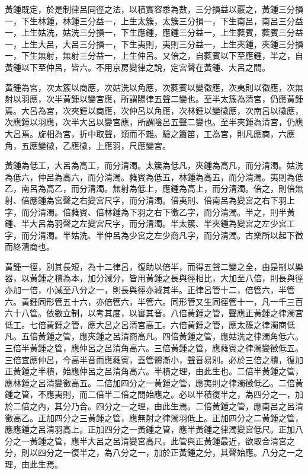 \begin{pinyinscope}
黃鍾既定，於是制律呂同徑之法，以積實容黍為數，三分損益以覈之，黃鍾三分損一，下生林鍾，林鍾三分益一，上生太簇，太簇三分損一，下生南呂，南呂三分益一，上生姑洗，姑洗三分損一，下生應鍾，應鍾三分益一，上生蕤賓，蕤賓三分益一，上生大呂，大呂三分損一，下生夷則，夷則三分益一，上生夾鍾，夾鍾三分損一，下生無射，無射三分益一，上生仲呂。又倍之，自蕤賓以下至應鍾，半之，自黃鍾以下至仲呂，皆六。不用京房變律之說，定宮聲在黃鍾、大呂之間。

黃鍾為宮，次太簇以商應，次姑洗以角應，次蕤賓以變徵應，次夷則以徵應，次無射以羽應，次半黃鍾以變宮應，所謂陽律五聲二變也。至半太簇為清宮，仍應黃鍾焉。大呂為宮，次夾鍾以商應，次仲呂以角應，次林鍾以變徵應，次南呂以徵應，次應鍾以羽應，次半大呂以變宮應，所謂陰呂五聲二變也。至半夾鍾為清宮，仍應大呂焉。旋相為宮，折中取聲，類而不雜。驗之簫笛，工為宮，則凡應商，六應角，五應變徵，乙應徵，上應羽，尺應變宮。

黃鍾為低工，大呂為高工，而分清濁。太簇為低凡，夾鍾為高凡，而分清濁。姑洗為低六，仲呂為高六，而分清濁。蕤賓為低五，林鍾為高五，而分清濁。夷則為低乙，南呂為高乙，而分清濁。無射為低上，應鍾為高上，而分清濁。倍之，則倍無射、倍應鍾為宮聲之右變宮尺字，而分清濁。倍夷則、倍南呂為變宮之右下羽上字，而分清濁。倍蕤賓、倍林鍾為下羽之右下徵乙字，而分清濁。半之，則半黃鍾、半大呂為羽聲之左變宮尺字，而分清濁。半太簇、半夾鍾為變宮之左少宮工字，而分清濁。半姑洗、半仲呂為少宮之左少商凡字，而分清濁。古樂所以起下徵而終清商也。

黃鍾一徑，別其長短，為十二律呂，復助以倍半，而得五聲二變之全，由是制以樂器，以黃鍾之積為本，加分減分，皆用黃鍾之長與徑相比，大加至八倍，則長與徑亦加一倍，小減至八分之一，則長與徑亦減其半。正律呂管十二，倍管六，半管六。黃鍾同形管五十六，亦倍管六，半管六。同形管又生同徑管十一，凡一千三百六十八管。依數立制，以考其度，以審其音。八倍黃鍾之管，聲應正黃鍾之律濁宮低工。七倍黃鍾之管，應大呂之呂清宮高工。六倍黃鍾之管，應太簇之律濁商低凡。五倍黃鍾之管，應夾鍾之呂清商高凡。四倍黃鍾之管，應姑洗之律濁角低六。三倍半黃鍾之管，應仲呂之呂清角高六。三倍黃鍾之管，應蕤賓之律濁變徵低五。三倍宜應仲呂，今高半音而應蕤賓，蓋管體漸小，聲音易別。必於三倍之積，復加正黃鍾之半積，始應仲呂之呂清角高六。半積之理，由此生也。二倍半黃鍾之管，應林鍾之呂清變徵高五。二倍加四分之一黃鍾之管，應夷則之律濁徵低乙。二倍黃鍾之管，不應夷則，而二倍半二倍之間始應之。必以半積復半之，為四分之一，加於二倍之內，其分乃合。四分之一之理，由此生焉。二倍黃鍾之管，應南呂之呂清徵高乙。正加四分之三黃鍾之管，應無射之律濁羽低上。正加四分之二黃鍾之管，應應鍾之呂清羽高上。正加四分之一黃鍾之管，應半黃鍾之律濁變宮低尺。正加八分之一黃鍾之管，應半大呂之呂清變宮高尺。此管與正黃鍾最近，欲取合清宮之分，則以四分之一復半之，為八分之一，加於正黃鍾之分，其聲始應。八分之一之理，由此生焉。


\end{pinyinscope}
